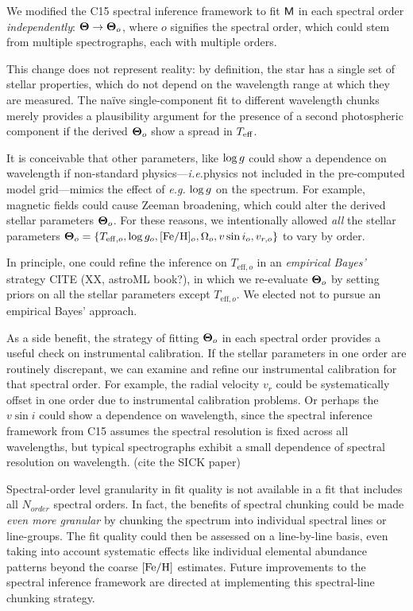 \documentclass[twocolumn]{emulateapj}%
\newcommand{\iancze}{{\sc C15 }}
\begin{document}
We modified the \iancze spectral inference framework to fit $\mathsf{M}$ in each spectral order \emph{independently}: ${\bm \Theta} \rightarrow {\bm \Theta}_o$, where $o$ signifies the spectral order, which could stem from multiple spectrographs, each with multiple orders.  

This change does not represent reality: by definition, the star has a single set of stellar properties, which do not depend on the wavelength range at which they are measured.  The na\"ive single-component fit to different wavelength chunks merely provides a plausibility argument for the presence of a second photospheric component if the derived ${\bm \Theta}_o$ show a spread in $T_\textrm{eff}$.  

It is conceivable that other parameters, like $\log g$ could show a dependence on wavelength if non-standard physics---\emph{i.e.}physics not included in the pre-computed model grid---mimics the effect of \emph{e.g.} $\log g$ on the spectrum.  For example, magnetic fields could cause Zeeman broadening, which could alter the derived stellar parameters ${\bm \Theta}_o$.  For these reasons, we intentionally allowed \emph{all} the stellar parameters ${\bm \Theta}_o = \{T_{\mathrm{eff},o}, \log{g_o}, [{\rm Fe}/{\rm H}]_o, \Omega_{o}, v\sin{i}_o, v_{r,o}\}$ to vary by order.  

In principle, one could refine the inference on $T_{\mathrm{eff},o}$ in an \emph{empirical Bayes'} strategy CITE (XX, astroML book?), in which we re-evaluate ${\bm \Theta}_o$ by setting priors on all the stellar parameters except $T_{\mathrm{eff},o}$.  We elected not to pursue an empirical Bayes' approach.

As a side benefit, the strategy of fitting ${\bm \Theta}_o$ in each spectral order provides a useful check on instrumental calibration. If the stellar parameters in one order are routinely discrepant, we can examine and refine our instrumental calibration for that spectral order.  For example, the radial velocity $v_r$ could be systematically offset in one order due to instrumental calibration problems.  Or perhaps the $v\sin{i}$ could show a dependence on wavelength, since the spectral inference framework from \iancze assumes the spectral resolution is fixed across all wavelengths, but typical spectrographs exhibit a small dependence of spectral resolution on wavelength.  (cite the SICK paper)

Spectral-order level granularity in fit quality is not available in a fit that includes all $N_{order}$ spectral orders.  In fact, the benefits of spectral chunking could be made \emph{even more granular} by chunking the spectrum into individual spectral lines or line-groups.  The fit quality could then be assessed on a line-by-line basis, even taking into account systematic effects like individual elemental abundance patterns beyond the coarse $[{\rm Fe}/{\rm H}]$ estimates.  Future improvements to the spectral inference framework are directed at implementing this spectral-line chunking strategy.  
\end{document}

